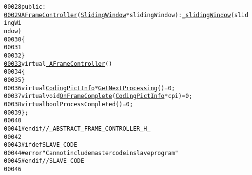 \begin{footnotesize}
\begin{alltt}
00028 \textcolor{keyword}{public}:
\hypertarget{_a_frame_controller_8h_source_l00029}{}\hyperlink{class_a_frame_controller_a448319ad03f91eebc5da7fdf8a43516c}{00029}         \hyperlink{class_a_frame_controller_a448319ad03f91eebc5da7fdf8a43516c}{AFrameController}(\hyperlink{class_sliding_window}{SlidingWindow} *slidingWindow) : \hyperlink{class_a_frame_controller_aca7790494d5c5d114171269ddaabd568}{_slidingWindow}(slidingWi
      ndow)
00030         \{
00031 
00032         \}
\hypertarget{_a_frame_controller_8h_source_l00033}{}\hyperlink{class_a_frame_controller_a71b793347efaa6e35b494ae728739ad0}{00033}         \textcolor{keyword}{virtual} \hyperlink{class_a_frame_controller_a71b793347efaa6e35b494ae728739ad0}{~AFrameController}()
00034         \{
00035         \}
00036         \textcolor{keyword}{virtual} \hyperlink{struct_coding_pict_info}{CodingPictInfo} *\hyperlink{class_a_frame_controller_acc142fa10ce535ee171698af719c4d27}{GetNextProcessing}() = 0;
00037         \textcolor{keyword}{virtual} \textcolor{keywordtype}{void} \hyperlink{class_a_frame_controller_afd4834463eebfc33536fed009bfb966c}{OnFrameComplete}(\hyperlink{struct_coding_pict_info}{CodingPictInfo} *cpi) = 0;
00038         \textcolor{keyword}{virtual} \textcolor{keywordtype}{bool} \hyperlink{class_a_frame_controller_a92ba4b7f8c0c84fff8be7203fae5221d}{ProcessCompleted}() = 0;
00039 \};
00040 
00041 \textcolor{preprocessor}{#endif //\_ABSTRACT\_FRAME\_CONTROLLER\_H\_}
00042 \textcolor{preprocessor}{}
00043 \textcolor{preprocessor}{#ifdef SLAVE\_CODE}
00044 \textcolor{preprocessor}{}\textcolor{preprocessor}{#error "Can not include master code in slave program"}
00045 \textcolor{preprocessor}{}\textcolor{preprocessor}{#endif // SLAVE\_CODE}
00046 \textcolor{preprocessor}{}
\end{alltt}\end{footnotesize}
